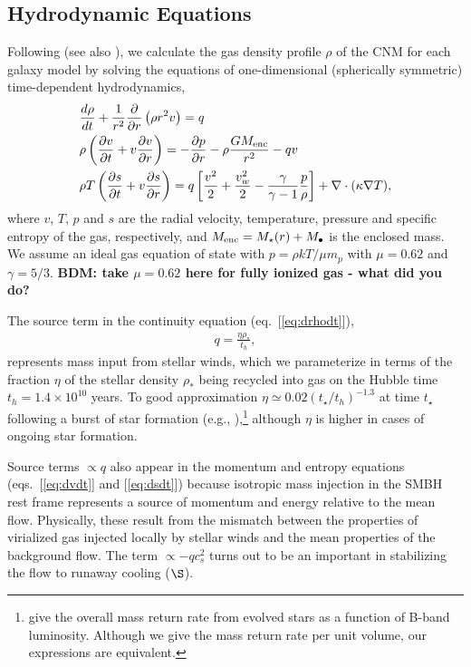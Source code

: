 \documentclass[usenatbib,fleqn]{mn2e}
\newcommand{\dxdy}[2]{\frac{d #1}{d #2} }
\newcommand{\drhodt}{\dxdy{\rho}{t}}
\newcommand{\ke}{\frac{v^2}{2}}
\newcommand{\kew}{\frac{v_w^2}{2}}
\newcommand{\gammaf}{\frac{\gamma}{\gamma-1}}
\newcommand{\cs}{\frac{p}{\rho}}
\newcommand{\rhostar}{\rho_*}
\newcommand{\Mbh}[1][]{M_{\bullet#1}}
\renewcommand{\th}{t_h}
\begin{document}
\subsection{Hydrodynamic Equations}
\label{sec:hydro}

Following \citet{Quataert:2004a} (see also \citealt{HolzerAxford:1970a,De-ColleGuillochon+:2012a,ShcherbakovWong+:2014a}), we calculate the gas density profile $\rho$ of the CNM for each galaxy model by solving the equations of one-dimensional (spherically symmetric) time-dependent hydrodynamics,
\begin{align}
  &\drhodt+\frac{1}{r^2}\frac{\partial}{\partial r}\left(\rho r^2 v\right)=q \label{eq:drhodt}\\
  &\rho \left(\frac{\partial v}{\partial t} + v\frac{\partial
      v}{\partial r}\right) =-\frac{\partial p}{\partial r}- \rho\frac{GM_{\rm enc}}{r^{2}} -q v \label{eq:dvdt}\\
  &\rho T\left(\frac{\partial s}{\partial t} + v\frac{\partial
      s}{\partial r}\right)=q\left[\ke+\kew-\gammaf \cs \right] +\nabla\cdot(\kappa \nabla T)
, 
\label{eq:dsdt}
\end{align}
where $v$, $T$, $p$ and $s$ are the radial velocity, temperature,
pressure and specific entropy of the gas, respectively, and $M_{\rm enc} = M_{\star}(r) + \Mbh$ is the
enclosed mass.  We assume an ideal gas equation of state with $p =
\rho kT/\mu m_p$ with $\mu = 0.62$  and $\gamma = 5/3$. {\bf BDM: take $\mu = 0.62$ here for fully ionized gas - what did you do?}

The source term in the continuity equation (eq.~[\ref{eq:drhodt}]),
\begin{align}
  q=\frac{\eta \rhostar}{\th},
\label{eq:q}
\end{align}
represents mass input from stellar winds, which we parameterize in
terms of the fraction $\eta$ of the stellar density $\rhostar$ being
recycled into gas on the Hubble time $\th = 1.4 \times 10^{10}$
years.  To good approximation $\eta\simeq 0.02 (t_{\star}/t_h)^{-1.3}$ at time $t_{\star}$ following a burst of star formation (e.g., \citealt{Ciotti+91}),\footnote{\citet{Ciotti+91} give the overall mass return rate from evolved stars as a function of B-band luminosity.  Although we give the mass return rate per unit volume, our expressions are equivalent.} although $\eta$ is higher in cases of ongoing star formation.  

Source terms $\propto q$ also appear in the momentum and entropy equations (eqs.~[\ref{eq:dvdt}] and [\ref{eq:dsdt}]) because isotropic mass injection in the SMBH rest frame represents a source of momentum and energy relative to the mean flow.  Physically, these result from the mismatch between the properties of virialized gas injected locally by stellar winds and the mean properties of the background flow.   The term $\propto -q c_{s}^{2}$ turns out to be an important in stabilizing the flow to runaway cooling ($\S$).
\end{document}
